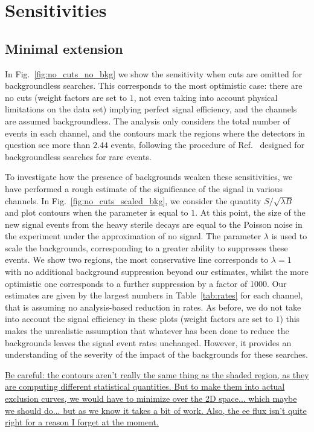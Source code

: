 \documentclass[11pt, a4paper]{article}
\newcommand{\reffig}[1]{Fig.~\ref{#1}}
\newcommand{\reftab}[1]{Table~\ref{#1}}
\newcommand{\refref}[1]{Ref.~\cite{#1}}
\newcommand{\newtext}[2]{\textcolor{#1}{\ul{#2}}}
\begin{document}
\section{Sensitivities}

\subsection{Minimal extension}

In \reffig{fig:no_cuts_no_bkg} we show the sensitivity when cuts are omitted
for backgroundless searches. This corresponds to the most optimistic case:
there are no cuts (weight factors are set to $1$, not even taking into account
physical limitations on the data set) implying perfect signal efficiency, and
the channels are assumed backgroundless.
%
The analysis only considers the total number of events in each channel, and the
contours mark the regions where the detectors in question see more than $2.44$
events, following the procedure of \refref{Feldman:1997qc} designed for
backgroundless searches for rare events. 

To investigate how the presence of backgrounds weaken these sensitivities, we
have performed a rough estimate of the significance of the signal in various
channels. In \reffig{fig:no_cuts_scaled_bkg}, we consider the quantity
$S/\sqrt{\lambda B}$ and plot contours when the parameter is equal to $1$. At
this point, the size of the new signal events from the heavy sterile decays are
equal to the Poisson noise in the experiment under the approximation of no
signal. The parameter $\lambda$ is used to scale the backgrounds, corresponding
to a greater ability to suppresses these events.  We show two regions, the most
conservative line corresponds to $\lambda=1$ with no additional background
suppression beyond our estimates, whilst the more optimistic one corresponds to
a further suppression by a factor of 1000. Our estimates are given by the
largest numbers in \reftab{tab:rates} for each channel, that is assuming no
analysis-based reduction in rates. As before, we do not take into account the
signal efficiency in these plots (weight factors are set to $1$) this makes the
unrealistic assumption that whatever has been done to reduce the backgrounds
leaves the signal event rates unchanged. However, it provides an understanding of 
the severity of the impact of the backgrounds for these searches.

\newtext{PB}{Be careful: the contours aren't really the same thing as the
shaded region, as they are computing different statistical quantities. But to
make them into actual exclusion curves, we would have to minimize over the 2D
space... which maybe we should do... but as we know it takes a bit of work.
Also, the ee flux isn't quite right for a reason I forget at the moment.}
\end{document}
